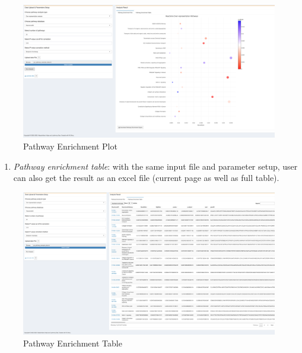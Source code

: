 \documentclass[
  a4paper,
  oneside,
  open=any]{scrreport}
\providecommand{\tightlist}{%
  \setlength{\itemsep}{0pt}\setlength{\parskip}{0pt}}\usepackage{longtable,booktabs,array}
\begin{document}
\begin{figure}[H]

{\centering \includegraphics{./_images/Pathway-Enrichment.png}

}

\caption{Pathway Enrichment Plot}

\end{figure}

\begin{enumerate}
\def\labelenumi{\arabic{enumi}.}
\setcounter{enumi}{1}
\tightlist
\item
  \emph{Pathway enrichment table}: with the same input file and
  parameter setup, user can also get the result as an excel file
  (current page as well as full table).\\
\end{enumerate}

\begin{figure}[H]

{\centering \includegraphics{./_images/PathEnrichTable1.png}

}

\caption{Pathway Enrichment Table}

\end{figure}
\end{document}
